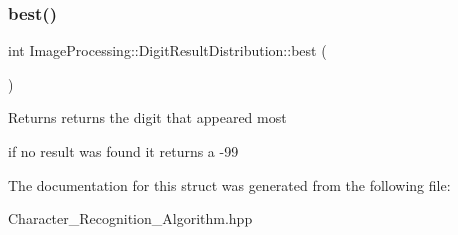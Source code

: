 \subsubsection{\texorpdfstring{best()}{best()}}
{\footnotesize\ttfamily int Image\+Processing\+::\+Digit\+Result\+Distribution\+::best (\begin{DoxyParamCaption}{ }\end{DoxyParamCaption})\hspace{0.3cm}{\ttfamily [inline]}}

\begin{DoxyReturn}{Returns}
returns the digit that appeared most 

if no result was found it returns a -\/99 
\end{DoxyReturn}


The documentation for this struct was generated from the following file\+:\begin{DoxyCompactItemize}
\item 
Character\+\_\+\+Recognition\+\_\+\+Algorithm.\+hpp\end{DoxyCompactItemize}
